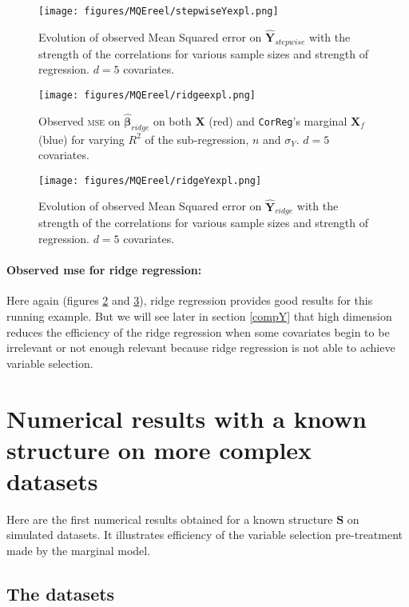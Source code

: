 \documentclass[12pt,a4paper]{report}
\begin{document}
	 \begin{figure}
	 \centering
	  \texttt{[image: figures/MQEreel/stepwiseYexpl.png]}
	  \caption{Evolution of observed Mean Squared error on $\hat{\boldsymbol{Y}}_{stepwise}$ with the strength of the correlations for various sample sizes and strength of regression. $d=5$ covariates. } \label{MQEstepwiseYexpl}
	\end{figure}
	\begin{figure}[h!]
	\texttt{[image: figures/MQEreel/ridgeexpl.png]}
	\caption{Observed \textsc{mse} on $\hat{\boldsymbol{\beta}}_{ridge}$ on both $\boldsymbol{X}$ (red) and {\tt CorReg}'s marginal $\boldsymbol{X}_f$ (blue) for varying $R^2$ of the sub-regression, $n$ and $\sigma_Y$. $d=5$ covariates.}\label{MSEridgexpl}
\end{figure} 
	
	 \begin{figure}
	 \centering
	  \texttt{[image: figures/MQEreel/ridgeYexpl.png]}
	  \caption{Evolution of observed Mean Squared error on $\hat{\boldsymbol{Y}}_{ridge}$ with the strength of the correlations for various sample sizes and strength of regression. $d=5$ covariates. } \label{MQEridgeYexpl}
	\end{figure}	


 		\FloatBarrier	
		\paragraph{Observed {\sc mse} for ridge regression:}	
Here again (figures \ref{MSEridgexpl} and \ref{MQEridgeYexpl}), ridge regression provides good results for this running example. But we will see later in section \ref{compY} that high dimension reduces the efficiency of the ridge regression when some covariates begin to be irrelevant or not enough relevant because ridge regression is not able to achieve variable selection. 
			
	
		
\section{Numerical results with a known structure on more complex datasets}	\label{chaptersimulexpl}
 Here are the first numerical results obtained for a known structure $\boldsymbol{S}$ on simulated datasets. It illustrates efficiency of the variable selection pre-treatment made by the marginal model.
		 
	
	\subsection{The datasets}\label{thedatasets}
		
\end{document}

